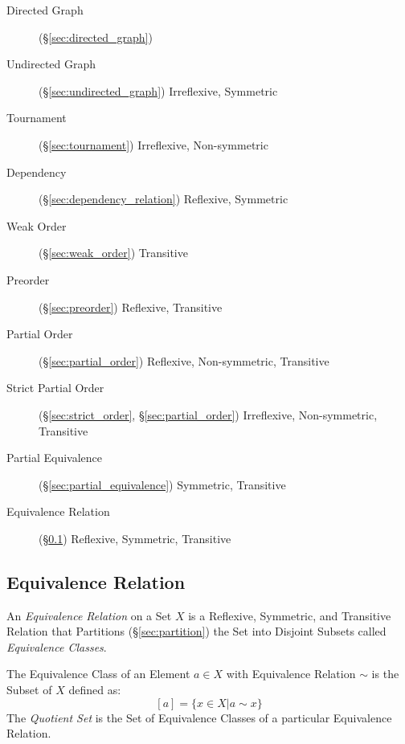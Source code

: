 \begin{description}
\item [Directed Graph] (\S\ref{sec:directed_graph})

\item [Undirected Graph] (\S\ref{sec:undirected_graph}) Irreflexive, Symmetric

\item [Tournament] (\S\ref{sec:tournament}) Irreflexive, Non-symmetric

\item [Dependency] (\S\ref{sec:dependency_relation}) Reflexive, Symmetric

\item [Weak Order] (\S\ref{sec:weak_order}) Transitive

\item [Preorder] (\S\ref{sec:preorder}) Reflexive, Transitive

\item [Partial Order] (\S\ref{sec:partial_order}) Reflexive,
  Non-symmetric, Transitive

\item [Strict Partial Order] (\S\ref{sec:strict_order},
  \S\ref{sec:partial_order}) Irreflexive, Non-symmetric, Transitive

\item [Partial Equivalence] (\S\ref{sec:partial_equivalence})
  Symmetric, Transitive

\item [Equivalence Relation] (\S\ref{sec:equivalence_relation})
  Reflexive, Symmetric, Transitive

\end{description}



\subsection{Equivalence Relation}\label{sec:equivalence_relation}

An \emph{Equivalence Relation} on a Set $X$ is a Reflexive, Symmetric,
and Transitive Relation that Partitions (\S\ref{sec:partition}) the
Set into Disjoint Subsets called \emph{Equivalence Classes}.

The Equivalence Class of an Element $a \in X$ with Equivalence
Relation $\sim$ is the Subset of $X$ defined as:
\[
    [a] = \{x \in X | a \sim x\}
\]
The \emph{Quotient Set} is the Set of Equivalence Classes of a
particular Equivalence Relation.

